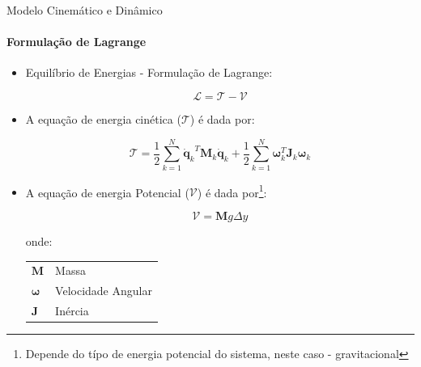\documentclass{beamer}
\begin{document}
\begin{frame}{Modelo Cinemático e Dinâmico}
    \framesubtitle{Formulação de Lagrange}

    \begin{itemize}

        \item Equilíbrio de Energias - Formulação de Lagrange:

              \begin{equation}
                  \mathcal{L}= \mathcal{T} - \mathcal{V}
              \end{equation}

        \item A equação de energia cinética ($\mathcal{T}$) é dada por:

            \begin{equation}
                \mathcal{T} = \frac{1}{2} \sum\limits_{k=1}^{N}{\mathbf{\dot{q}}_k}^T  \mathbf{M}_k {\mathbf{\dot{q}}_k}+ \frac{1}{2} \sum\limits_{k=1}^{N}\mathbf{\omega}_k^T \mathbf{J}_k \mathbf{\omega}_k
            \end{equation}

        \item A equação de energia Potencial ($\mathcal{V}$) é dada por\footnote{Depende do típo de energia potencial do sistema, neste caso - gravitacional}:

            \begin{equation}
                \mathcal{V} = \mathbf{M}g\Delta y 
            \end{equation}  


              \begin{block}{}
                  \scriptsize{
                      onde:
                      \begin{tabular}{l|l}
                          $\mathbf{M}$               & Massa              \\
                          $\mathbf{\omega}$ & Velocidade Angular \\
                          $\mathbf{J}$               & Inércia            \\
                      \end{tabular}}
              \end{block}
    \end{itemize}
\end{frame}
\end{document}
